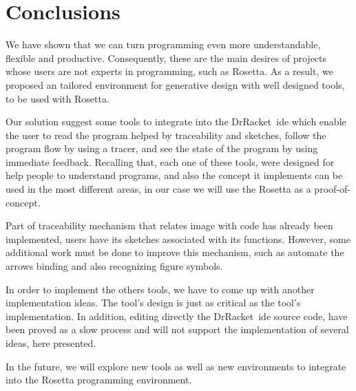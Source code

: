
% 
% 

\section{Conclusions}
\label{sec:fin}

We have shown that we can turn programming even more understandable, flexible and productive. Consequently, these are the main desires of projects whose users are not experts in programming, such as Rosetta. As a result, we proposed an tailored environment for generative design with well designed tools, to be used with Rosetta.

Our solution suggest some tools to integrate into the DrRacket~\ac{ide} which enable the user to read the program helped by traceability and sketches, follow the program flow by using a tracer, and see the state of the program by using immediate feedback. Recalling that, each one of these tools, were designed for help people to understand programs, and also the concept it implements can be used in the most different areas, in our case we will use the Rosetta as a proof-of-concept.

Part of traceability mechanism that relates image with code has already been implemented, users have its sketches associated with its functions. However, some additional work must be done to improve this mechanism, such as automate the arrows binding and also recognizing figure symbols.

In order to implement the others tools, we have to come up with another implementation ideas. The tool's design is just as critical as the tool's implementation. In addition, editing directly the DrRacket~\ac{ide} source code, have been proved as a slow process and will not support the implementation of several ideas, here presented. 

In the future, we will explore new tools as well as new environments to integrate into the Rosetta programming environment.